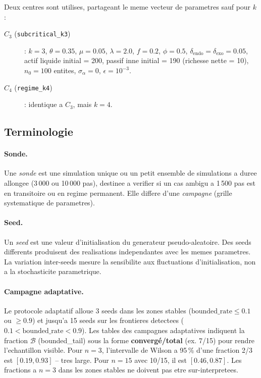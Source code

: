 \documentclass[11pt,a4paper]{article}
\begin{document}
Deux centres sont utilises, partageant le meme vecteur de parametres
sauf pour $k$ :

\begin{description}
  \item[$C_3$ (\texttt{subcritical\_k3})] :
    $k=3$, $\theta=0.35$, $\mu=0.05$, $\lambda=2.0$, $f=0.2$, $\phi=0.5$,
    $\delta_{\mathrm{endo}} = \delta_{\mathrm{exo}} = 0.05$,
    actif liquide initial = 200, passif inne initial = 190
    (richesse nette = 10), $n_0=100$ entites, $\sigma_\alpha=0$,
    $\epsilon=10^{-3}$.
  \item[$C_4$ (\texttt{regime\_k4})] : identique a $C_3$, mais $k=4$.
\end{description}

\subsection*{Terminologie}

\paragraph{Sonde.}
Une \emph{sonde} est une simulation unique ou un petit ensemble de simulations
a duree allongee (3\,000 ou 10\,000 pas), destinee a verifier si un cas
ambigu a 1\,500 pas est en transitoire ou en regime permanent. Elle differe
d'une \emph{campagne} (grille systematique de parametres).

\paragraph{Seed.}
Un \emph{seed} est une valeur d'initialisation du generateur pseudo-aleatoire.
Des seeds differents produisent des realisations independantes avec les memes
parametres. La variation inter-seeds mesure la sensibilite aux fluctuations
d'initialisation, non a la stochasticite parametrique.

\paragraph{Campagne adaptative.}
Le protocole adaptatif alloue 3 seeds dans les zones stables
(\(\text{bounded\_rate} \le 0.1\) ou \(\ge 0.9\)) et jusqu'a 15 seeds
sur les frontieres detectees (\(0.1 < \text{bounded\_rate} < 0.9\)).
Les tables des campagnes adaptatives indiquent la fraction
\(\mathcal{B}\) (bounded\_tail) sous la forme \textbf{convergé/total} (ex. 7/15)
pour rendre l'echantillon visible.
Pour $n=3$, l'intervalle de Wilson a 95\,\% d'une fraction 2/3 est
$[0.19, 0.93]$ -- tres large. Pour $n=15$ avec 10/15, il est $[0.46, 0.87]$.
Les fractions a $n=3$ dans les zones stables ne doivent pas etre sur-interpretees.
\end{document}
